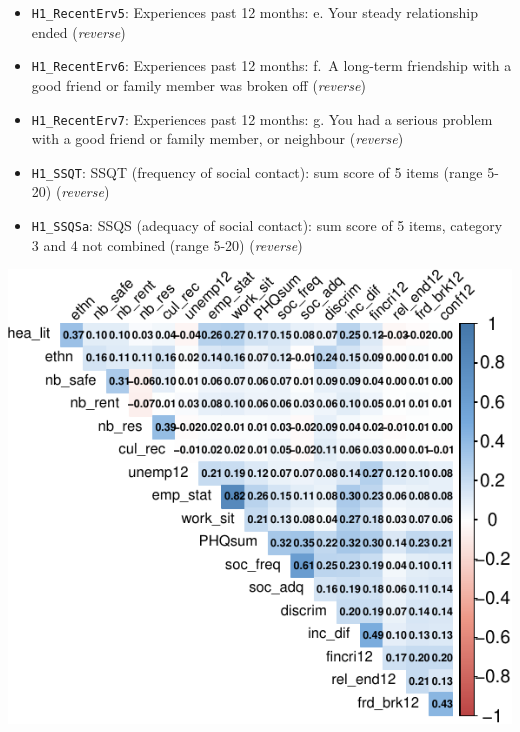 \documentclass[
]{article}
\providecommand{\tightlist}{%
  \setlength{\itemsep}{0pt}\setlength{\parskip}{0pt}}\usepackage{longtable,booktabs,array}
\begin{document}
\begin{itemize}
\tightlist
\item
  \texttt{H1\_RecentErv5}: Experiences past 12 months: e. Your steady
  relationship ended (\emph{reverse})
\item
  \texttt{H1\_RecentErv6}: Experiences past 12 months: f.~A long-term
  friendship with a good friend or family member was broken off
  (\emph{reverse})
\item
  \texttt{H1\_RecentErv7}: Experiences past 12 months: g. You had a
  serious problem with a good friend or family member, or neighbour
  (\emph{reverse})
\item
  \texttt{H1\_SSQT}: SSQT (frequency of social contact): sum score of 5
  items (range 5-20) (\emph{reverse})
\item
  \texttt{H1\_SSQSa}: SSQS (adequacy of social contact): sum score of 5
  items, category 3 and 4 not combined (range 5-20) (\emph{reverse})
\end{itemize}

\begin{center}
\includegraphics{draft_v1_files/figure-pdf/unnamed-chunk-8-1.pdf}
\end{center}
\end{document}
